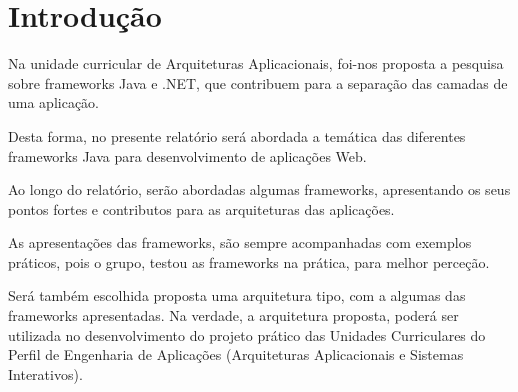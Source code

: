 \chapter{Introdução}
\label{sec:introducao}

\hspace{5mm} Na unidade curricular de Arquiteturas Aplicacionais, foi-nos proposta a pesquisa sobre frameworks Java e .NET, que contribuem para a separação das camadas de uma aplicação.

\hspace{5mm}Desta forma, no presente relatório será abordada a temática das diferentes frameworks Java para desenvolvimento de aplicações Web. 

\hspace{5mm} Ao longo do relatório, serão abordadas algumas frameworks, apresentando os seus pontos fortes e contributos para as arquiteturas das aplicações. 

\hspace{5mm} As apresentações das frameworks, são sempre acompanhadas com exemplos práticos, pois o grupo, testou as frameworks na prática, para melhor perceção. 

\hspace{5mm}Será também escolhida proposta uma arquitetura tipo, com a algumas das frameworks apresentadas. Na verdade, a arquitetura proposta, poderá ser utilizada no desenvolvimento do projeto prático das Unidades Curriculares do Perfil de Engenharia de Aplicações (Arquiteturas Aplicacionais e Sistemas Interativos).